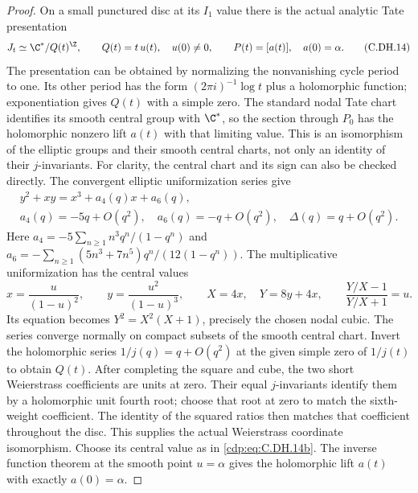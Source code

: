 \begin{proof}
On a small punctured
disc at its $I_1$ value
there is the actual
analytic Tate presentation
\[
 J_t\simeq\C^*/Q(t)^{\Z},\qquad
 Q(t)=t\,u(t),\quad u(0)\ne0,
 \qquad P(t)=[a(t)],\quad a(0)=\alpha.
                                                               \tag{C.DH.14}\label{cdp:eq:C.DH.14}
\]
The presentation can be
obtained by normalizing
the nonvanishing cycle
period to one. Its
other period has the
form $(2\pi i)^{-1}\log t$
plus a holomorphic
function; exponentiation
gives $Q(t)$ with a
simple zero. The
standard nodal Tate
chart identifies its
smooth central group
with $\C^*$, so the
section through $P_0$
has the holomorphic
nonzero lift $a(t)$
with that limiting
value. This is an
isomorphism of the
elliptic groups and
their smooth central
charts, not only an
identity of their
$j$-invariants.
For clarity, the central
chart and its sign can
also be checked directly.
The convergent elliptic
uniformization series give
\[
 \begin{gathered}
 y^2+xy=x^3+a_4(q)x+a_6(q),\\
 a_4(q)=-5q+O(q^2),\quad
 a_6(q)=-q+O(q^2),\quad
 \Delta(q)=q+O(q^2).
 \end{gathered}                                 \tag{C.DH.14a}\label{cdp:eq:C.DH.14a}
\]
Here $a_4=-5\sum_{n\ge1}n^3q^n/(1-q^n)$ and
$a_6=-\sum_{n\ge1}(5n^3+7n^5)q^n/(12(1-q^n))$.
The multiplicative
uniformization has the
central values
\[
 x=\frac{u}{(1-u)^2},\qquad
 y=\frac{u^2}{(1-u)^3},\qquad
 X=4x,\quad Y=8y+4x,\qquad
 \frac{Y/X-1}{Y/X+1}=u.                          \tag{C.DH.14b}\label{cdp:eq:C.DH.14b}
\]
Its equation becomes
$Y^2=X^2(X+1)$, precisely
the chosen nodal cubic.
The series converge
normally on compact
subsets of the smooth
central chart. Invert
the holomorphic series
$1/j(q)=q+O(q^2)$ at
the given simple zero
of $1/j(t)$ to obtain
$Q(t)$. After completing
the square and cube,
the two short Weierstrass
coefficients are units
at zero. Their equal
$j$-invariants identify
them by a holomorphic
unit fourth root; choose
that root at zero to
match the sixth-weight
coefficient. The identity
of the squared ratios
then matches that
coefficient throughout
the disc. This supplies
the actual Weierstrass
coordinate isomorphism.
Choose its central value
as in \eqref{cdp:eq:C.DH.14b}.
The inverse function
theorem at the smooth
point $u=\alpha$ gives
the holomorphic lift
$a(t)$ with exactly
$a(0)=\alpha$.


\end{proof}
